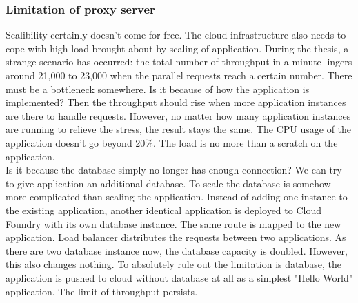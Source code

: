  \subsubsection{Limitation of proxy server}
 \label{haproxy}
Scalibility certainly doesn't come for free. The cloud infrastructure also needs to cope with high load brought about by scaling of application. During the thesis, a strange scenario has occurred: the total number of throughput in a minute lingers around 21,000 to 23,000 when the parallel requests reach a certain number. There must be a bottleneck somewhere. Is it because of how the application is implemented? Then the throughput should rise when more application instances are there to handle requests. However, no matter how many application instances are running to relieve the stress, the result stays the same.  The CPU usage of the application doesn't go beyond 20\%. The load is no more than a scratch on the application.\\
Is it because the database simply no longer has enough connection? We can try to give application an additional database. To scale the database is somehow more complicated than scaling the application. Instead of adding one instance to the existing application, another identical application is deployed to Cloud Foundry with its own database instance. The same route is mapped to the new application. Load balancer distributes the requests between two applications. As there are two database instance now, the database capacity is doubled. However, this also changes nothing. To absolutely rule out the limitation is database, the application is pushed to cloud without database at all as a simplest "Hello World" application. The limit of throughput persists. \\ 
